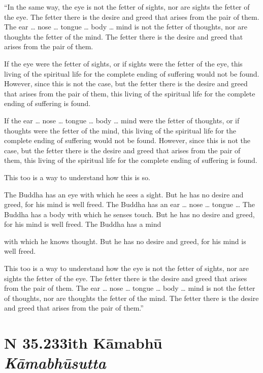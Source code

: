 \documentclass[12pt,openany]{book}%
\newcommand*{\suttatitleacronym}[1]{\smaller[2]{#1}\vspace*{.3em}}
\newcommand*{\suttatitletranslation}[1]{\linebreak{#1}}
\newcommand*{\suttatitleroot}[1]{\linebreak\smaller[2]\itshape{#1}}
\newcommand*{\tocacronym}[1]{\hspace*{-3.3em}{#1}\quad}
\newcommand*{\toctranslation}[1]{#1}
\newcommand*{\tocroot}[1]{(\textit{#1})}
\begin{document}
“In the same way, the eye is not the fetter of sights, nor are sights the fetter of the eye. The fetter there is the desire and greed that arises from the pair of them. The ear … nose … tongue … body … mind is not the fetter of thoughts, nor are thoughts the fetter of the mind. The fetter there is the desire and greed that arises from the pair of them. 

If the eye were the fetter of sights, or if sights were the fetter of the eye, this living of the spiritual life for the complete ending of suffering would not be found. However, since this is not the case, but the fetter there is the desire and greed that arises from the pair of them, this living of the spiritual life for the complete ending of suffering is found. 

If the ear … nose … tongue … body … mind were the fetter of thoughts, or if thoughts were the fetter of the mind, this living of the spiritual life for the complete ending of suffering would not be found. However, since this is not the case, but the fetter there is the desire and greed that arises from the pair of them, this living of the spiritual life for the complete ending of suffering is found. 

This too is a way to understand how this is so. 

The Buddha has an eye with which he sees a sight. But he has no desire and greed, for his mind is well freed. The Buddha has an ear … nose … tongue … The Buddha has a body with which he senses touch. But he has no desire and greed, for his mind is well freed. The Buddha has a mind 

with which he knows thought. But he has no desire and greed, for his mind is well freed. 

This too is a way to understand how the eye is not the fetter of sights, nor are sights the fetter of the eye. The fetter there is the desire and greed that arises from the pair of them. The ear … nose … tongue … body … mind is not the fetter of thoughts, nor are thoughts the fetter of the mind. The fetter there is the desire and greed that arises from the pair of them.” 

%
\section*{{\suttatitleacronym SN 35.233}{\suttatitletranslation With Kāmabhū }{\suttatitleroot Kāmabhūsutta}}
\addcontentsline{toc}{section}{\tocacronym{SN 35.233} \toctranslation{With Kāmabhū } \tocroot{Kāmabhūsutta}}
\end{document}
